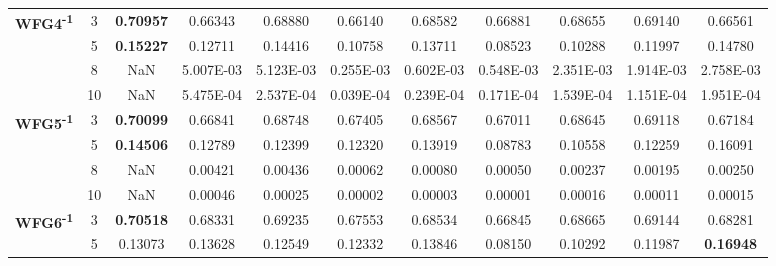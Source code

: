 \documentclass[conference]{IEEEtran}
\begin{document}
\begin{table*}[!htb]
\begin{tabular}{|c|c|c|c|c|c|c|c|c|c|c|}
	\multirow{4}{*}{\textbf{WFG4\textsuperscript{-1}}}  & 3          & \textbf{0.70957} & 0.66343           & 0.68880               & 0.66140          & 0.68582             & 0.66881             & 0.68655            & 0.69140              & 0.66561          \\ \cline{2-11} 
	& 5          & \textbf{0.15227} & 0.12711           & 0.14416               & 0.10758          & 0.13711             & 0.08523             & 0.10288            & 0.11997              & 0.14780          \\ \cline{2-11} 
	& 8          & NaN              & 5.007E-03         & 5.123E-03             & 0.255E-03        & 0.602E-03           & 0.548E-03           & 2.351E-03          & 1.914E-03            & 2.758E-03        \\ \cline{2-11} 
	& 10         & NaN              & 5.475E-04         & 2.537E-04             & 0.039E-04        & 0.239E-04           & 0.171E-04           & 1.539E-04          & 1.151E-04            & 1.951E-04        \\ \hline
	\multirow{4}{*}{\textbf{WFG5\textsuperscript{-1}}}  & 3          & \textbf{0.70099} & 0.66841           & 0.68748               & 0.67405          & 0.68567             & 0.67011             & 0.68645            & 0.69118              & 0.67184          \\ \cline{2-11} 
	& 5          & \textbf{0.14506} & 0.12789           & 0.12399               & 0.12320          & 0.13919             & 0.08783             & 0.10558            & 0.12259              & 0.16091          \\ \cline{2-11} 
	& 8          & NaN              & 0.00421           & 0.00436               & 0.00062          & 0.00080             & 0.00050             & 0.00237            & 0.00195              & 0.00250          \\ \cline{2-11} 
	& 10         & NaN              & 0.00046           & 0.00025               & 0.00002          & 0.00003             & 0.00001             & 0.00016            & 0.00011              & 0.00015          \\ \hline
	\multirow{4}{*}{\textbf{WFG6\textsuperscript{-1}}}  & 3          & \textbf{0.70518} & 0.68331           & 0.69235               & 0.67553          & 0.68534             & 0.66845             & 0.68665            & 0.69144              & 0.68281          \\ \cline{2-11} 
	& 5          & 0.13073          & 0.13628           & 0.12549               & 0.12332          & 0.13846             & 0.08150             & 0.10292            & 0.11987              & \textbf{0.16948} \\ \cline{2-11} 

\end{tabular}
\end{table*}
\end{document}
